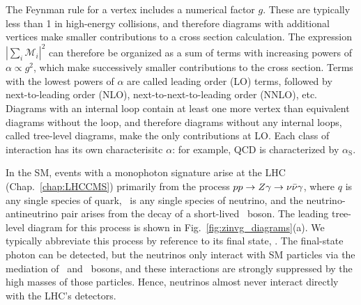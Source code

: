 \documentclass[oneside, letterpaper, 12pt, oldfontcommands]{memoir}
\begin{document}
The Feynman rule for a vertex includes a numerical factor $g$. These are typically less than 1 in high-energy collisions, and therefore diagrams
with additional vertices make smaller contributions to a cross section calculation.
The expression $|\sum_{i}{\mathcal{M}_{i}}|^{2}$ can therefore be organized as a sum of terms with increasing powers of $\alpha \propto g^{2}$, which make successively smaller
contributions to the cross section.
Terms with the lowest powers of $\alpha$ are called leading order (LO) terms, followed by next-to-leading order (NLO), next-to-next-to-leading order (NNLO), etc.
Diagrams with an internal loop contain at least one more vertex than equivalent diagrams without the loop, and therefore diagrams without any internal loops,
called tree-level diagrams, make the only contributions at LO. Each class of interaction has its own characterisitc $\alpha$: for example, QCD is characterized by $\alpha_\mathrm{S}$.

In the SM, events with a monophoton signature arise at the LHC (Chap.~\ref{chap:LHCCMS}) primarily from the process $pp \to Z\gamma \to \nu\bar{\nu}\gamma$,
where $q$ is any single species of quark, \Pn\ is any single species of neutrino, and the neutrino-antineutrino pair arises from the decay
of a short-lived \PZ\ boson. The leading tree-level diagram for this process is shown in Fig.~\ref{fig:zinvg_diagrams}(a). We typically abbreviate this process by
reference to its final state, \zinvg. The final-state photon can be detected, but the neutrinos only interact with SM particles via the mediation
of \PZ\ and \PW\ bosons, and these interactions are strongly suppressed by the high masses of those particles. Hence, neutrinos almost never interact directly with the LHC's detectors.
\end{document}

